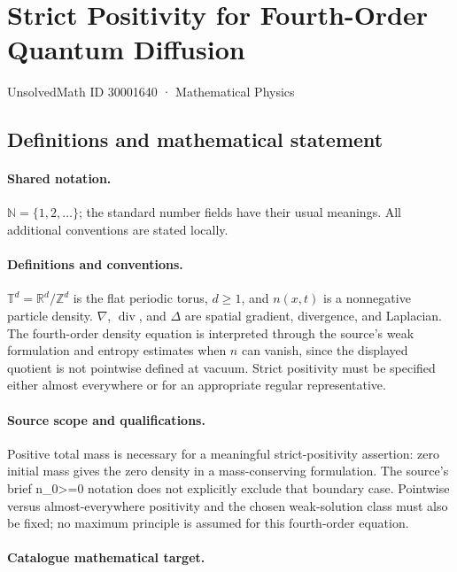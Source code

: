 \documentclass[11pt]{article}
\begin{document}
\setcounter{section}{30001639}
\section{Strict Positivity for Fourth-Order Quantum Diffusion}\label{30001640}
{\small UnsolvedMath ID 30001640 · Mathematical Physics}
\subsection{Definitions and mathematical statement}

\paragraph{Shared notation.}$\mathbb N=\{1,2,\ldots\}$; the standard number fields have their usual meanings. All additional conventions are stated locally.


\paragraph{Definitions and conventions.} $\mathbb T^d=\mathbb R^d/\mathbb Z^d$ is the flat periodic torus, $d\ge1$, and $n(x,t)$ is a nonnegative particle density. $\nabla$, $\operatorname{div}$, and $\Delta$ are spatial gradient, divergence, and Laplacian. The fourth-order density equation is interpreted through the source's weak formulation and entropy estimates when $n$ can vanish, since the displayed quotient is not pointwise defined at vacuum. Strict positivity must be specified either almost everywhere or for an appropriate regular representative.

\paragraph{Source scope and qualifications.} Positive total mass is necessary for a meaningful strict-positivity assertion: zero initial mass gives the zero density in a mass-conserving formulation. The source's brief n\_0>=0 notation does not explicitly exclude that boundary case. Pointwise versus almost-everywhere positivity and the chosen weak-solution class must also be fixed; no maximum principle is assumed for this fourth-order equation.

\paragraph{Catalogue mathematical target.}
\end{document}
